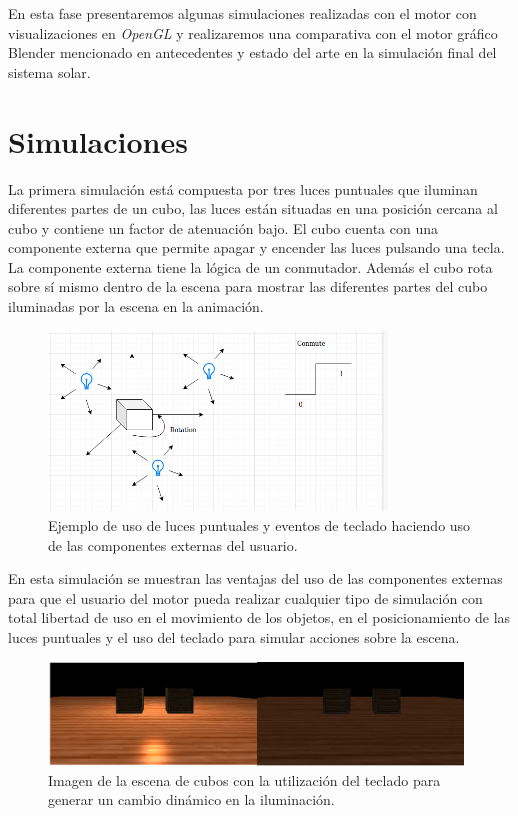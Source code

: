 \documentclass[a4paper]{book}
\begin{document}
En esta fase presentaremos algunas simulaciones realizadas con el motor con visualizaciones en \textit{OpenGL} y realizaremos una comparativa
con el motor gráfico Blender mencionado en antecedentes y estado del arte en la simulación final del sistema solar.

\section{Simulaciones}
\label{sec:Simulaciones}

La primera simulación está compuesta por tres luces puntuales que iluminan diferentes partes de un cubo, las luces están situadas
en una posición cercana al cubo y contiene un factor de atenuación bajo. El cubo cuenta con una componente externa que permite
apagar y encender las luces pulsando una tecla. La componente externa tiene la lógica de un conmutador. Además el cubo rota sobre
sí mismo dentro de la escena para mostrar las diferentes partes del cubo iluminadas por la escena en la animación.

\begin{figure}[H]
    \centering
    \includegraphics[width=9cm, keepaspectratio]{img/SimpleCube.png}
    \caption{Ejemplo de uso de luces puntuales y eventos de teclado haciendo uso de las componentes externas del usuario.}
    \label{SimpleCube}
\end{figure}

En esta simulación se muestran las ventajas del uso de las componentes externas para que el usuario del motor pueda realizar
cualquier tipo de simulación con total libertad de uso en el movimiento de los objetos, en el posicionamiento de las luces
puntuales y el uso del teclado para simular acciones sobre la escena.

\begin{figure}[H]
    \centering
    \includegraphics[width=11cm, keepaspectratio]{img/CubeEvents.png}
    \caption{Imagen de la escena de cubos con la utilización del teclado para generar un cambio dinámico en la iluminación.}
    \label{CubeEvents}
\end{figure}
\end{document}
